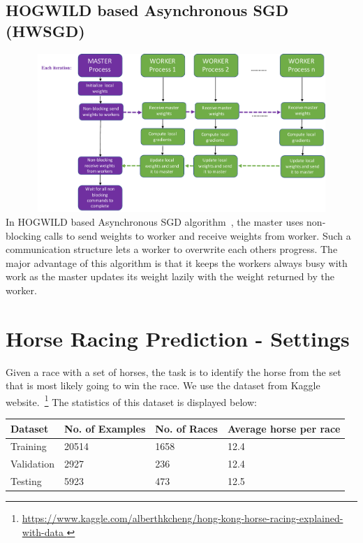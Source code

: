 \documentclass[12pt]{article}
\begin{document}
\subsection{HOGWILD based Asynchronous SGD (HWSGD)}
{\centering\includegraphics[width=14cm, height=6cm]{images/asynchw_cstruct.pdf}} \\
In HOGWILD based Asynchronous SGD algorithm~\cite{Hogwild2011}, the master uses non-blocking calls to send weights to worker and receive weights from worker. Such a communication structure lets a worker to overwrite each others progress. The major advantage of this algorithm is that it keeps the workers always busy with work as the master updates its weight lazily with the weight returned by the worker. %
 
\section{Horse Racing Prediction - Settings}
\label{sec:settings}
Given a race with a set of horses, the task is to identify the horse from the set that is most likely going to win the race. We use the dataset from Kaggle website.~\footnote{\url{https://www.kaggle.com/alberthkcheng/hong-kong-horse-racing-explained-with-data
}} The statistics of this dataset is displayed below:

\begin{table}[ht]
\centering
 \begin{tabular}{llll} 
 \toprule
\textbf{Dataset} & \textbf{No. of Examples} & \textbf{No. of Races} & \textbf{Average horse per race} \\ \midrule
Training & 20514 & 1658 & 12.4 \\
Validation & 2927 & 236 & 12.4 \\
Testing & 5923 & 473 & 12.5 \\
\bottomrule
\end{tabular}
\end{table}
\end{document}
